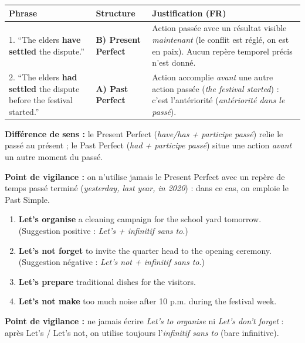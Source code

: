 \documentclass[11pt]{article}
\newcommand{\cle}[1]{{\popxbold\color{popdark}#1}}
\begin{document}
\begin{corrige}

\begin{center}
\begin{tabularx}{\linewidth}{|l|X|X|}\hline
\textbf{Phrase} & \textbf{Structure} & \textbf{Justification (FR)} \\ \hline
1. ``The elders \textbf{have settled} the dispute.'' & \textbf{B) Present Perfect} & Action passée avec un résultat visible \emph{maintenant} (le conflit est réglé, on est en paix). Aucun repère temporel précis n'est donné. \\ \hline
2. ``The elders \textbf{had settled} the dispute before the festival started.'' & \textbf{A) Past Perfect} & Action accomplie \emph{avant} une autre action passée (\emph{the festival started}) : c'est l'antériorité (\emph{antériorité dans le passé}). \\ \hline
\end{tabularx}
\end{center}

\textbf{Différence de sens :} le \cle{Present Perfect} (\emph{have/has + participe passé}) relie le passé au présent ; le \cle{Past Perfect} (\emph{had + participe passé}) situe une action \emph{avant} un autre moment du passé.

\textbf{Point de vigilance :} on n'utilise jamais le Present Perfect avec un repère de temps passé terminé (\emph{yesterday, last year, in 2020}) : dans ce cas, on emploie le Past Simple.
\end{corrige}

\begin{corrige}

\begin{enumerate}
\item \textbf{Let's organise} a cleaning campaign for the school yard tomorrow. (Suggestion positive : \emph{Let's + infinitif sans to}.)
\item \textbf{Let's not forget} to invite the quarter head to the opening ceremony. (Suggestion négative : \emph{Let's not + infinitif sans to}.)
\item \textbf{Let's prepare} traditional dishes for the visitors.
\item \textbf{Let's not make} too much noise after 10 p.m. during the festival week.
\end{enumerate}

\textbf{Point de vigilance :} ne jamais écrire \emph{Let's to organise} ni \emph{Let's don't forget} : après \cle{Let's / Let's not}, on utilise toujours l'\emph{infinitif sans to} (bare infinitive).
\end{corrige}
\end{document}
